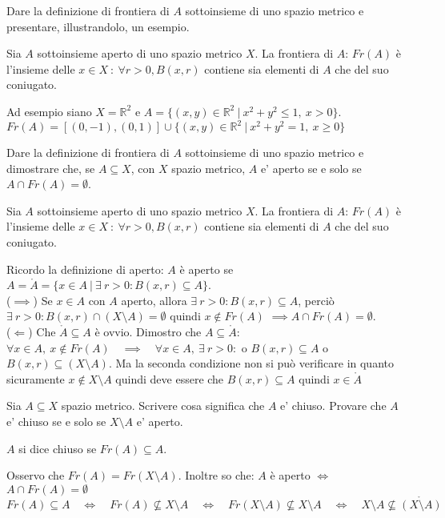 \documentclass{exam}
\newcommand{\R}[0]{\mathbb{R}}
\begin{document}
\begin{questions}
\question Dare la definizione di frontiera di $A$ sottoinsieme di uno spazio metrico e presentare, illustrandolo, un esempio.
\begin{solution}
    Sia $A$ sottoinsieme aperto di uno spazio metrico $X$.
    La frontiera di $A$: $Fr(A)$ è l'insieme delle $x\in X \ : \ \forall r>0, B(x,r)$ contiene sia elementi di $A$ che del suo coniugato.
    
    Ad esempio siano $X = \R^2$ e $A=\{(x,y) \in \R^2 \ | \ x^2+y^2 \leq 1, \ x>0\}$. 
    $Fr(A) = [(0,-1), (0,1)] \cup \{ (x,y) \in \R^2 \ | \ x^2+y^2 =1, \ x\geq0 \}$
\end{solution}

\question Dare la definizione di frontiera di $A$ sottoinsieme di uno spazio metrico e dimostrare che, se $A \subseteq X$, con $X$ spazio metrico, $A$ e’ aperto se e solo se $A \cap Fr(A) = \emptyset $.
\begin{solution}
    Sia $A$ sottoinsieme aperto di uno spazio metrico $X$.
    La frontiera di $A$: $Fr(A)$ è l'insieme delle $x\in X \ : \ \forall r>0, B(x,r)$ contiene sia elementi di $A$ che del suo coniugato.
    
    Ricordo la definizione di aperto: $A$ è aperto se $A = \mathring{A}=\{x \in A \ | \ \exists \ r>0 : B(x,r) \subseteq A\}$.\\ 
    ($\implies$) Se $x \in A$ con $A$ aperto, allora $\exists \ r>0 : B(x,r) \subseteq A$, perciò $\exists \ r>0 : B(x,r) \cap (X \setminus A) = \emptyset$
    quindi $x \not\in Fr(A)$ $\implies A\cap Fr(A) = \emptyset$.\\
    ($\Longleftarrow$) Che $ \mathring{A} \subseteq A$ è ovvio. Dimostro che $A \subseteq \mathring{A}$:\\
    $\forall x \in A, \ x \not\in Fr(A) \quad\implies\quad \forall x \in A,\  \exists\  r>0 : $ o $B(x,r) \subseteq A$ o $B(x,r) \subseteq (X\setminus A)$.
    Ma la seconda condizione non si può verificare in quanto sicuramente $x \not\in X \setminus A$ quindi deve essere che $B(x,r) \subseteq A$ quindi $x \in \mathring{A}$
\end{solution}

\question Sia $A \subseteq X$ spazio metrico. Scrivere cosa significa che $A$ e’ chiuso. Provare che $A$ e’ chiuso se e solo se $X \setminus A$ e’ aperto.
\begin{solution}
    $A$ si dice chiuso se $Fr(A) \subseteq A$.

    Osservo che $Fr(A) = Fr(X \setminus A)$. Inoltre so che: $A$ è aperto $\iff$ $A \cap Fr(A) = \emptyset$\\
    $Fr(A) \subseteq A \quad \iff \quad Fr(A) \not\subseteq X \setminus A \quad \iff \quad Fr(X \setminus A) \not\subseteq X \setminus A \quad\iff\quad X\setminus A \not\subseteq \mathring{(X\setminus A)}$
\end{solution}


\end{questions}
\end{document}
